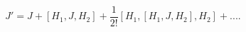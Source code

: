 \begin{equation}
         J'=J+[H_1,J,H_2]+\frac{1}{2!}[H_1,[H_1,J,H_2],H_2]+....     
\label{eq:ondort}
\end{equation}


